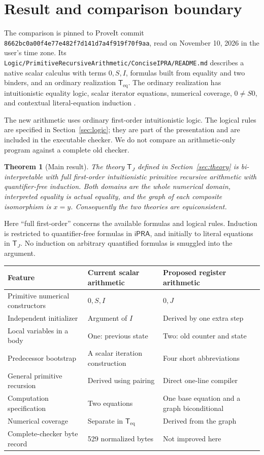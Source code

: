 \documentclass[11pt,letterpaper]{article}
\newtheorem{theorem}{Theorem}[section]
\theoremstyle{definition}\newtheorem{definition}[theorem]{Definition}
\theoremstyle{remark}\newtheorem{remark}[theorem]{Remark}
\newcommand{\ipra}{\mathsf{iPRA}}
\newcommand{\TJ}{\mathsf T_J}
\newcommand{\TI}{\mathsf T_{\mathrm{eq}}}
\newcommand{\file}[1]{{\small\nolinkurl{#1}}}
\begin{document}
\section{Result and comparison boundary}

The comparison is pinned to ProveIt commit
\texttt{8662bc0a00f4e77e482f7d141d7a4f919f70f9aa}, read on
November 10, 2026 in the user's time zone. Its
\file{Logic/PrimitiveRecursiveArithmetic/ConciseIPRA/README.md}
describes a native scalar calculus with terms $0,S,I$, formulas built
from equality and two binders, and an ordinary realization $\TI$.
The ordinary realization has intuitionistic equality logic, scalar
iterator equations, numerical coverage, $0\ne S0$, and contextual
literal-equation induction \cite{repo,basis}.

The new arithmetic uses ordinary first-order intuitionistic logic.
The logical rules are specified in Section~\ref{sec:logic}; they are
part of the presentation and are included in the executable checker.
We do not compare an arithmetic-only program against a complete old
checker.

\begin{theorem}[Main result]\label{thm:main}
The theory $\TJ$ defined in Section~\ref{sec:theory} is
bi-interpretable with full first-order intuitionistic primitive
recursive arithmetic with quantifier-free induction. Both domains are
the whole numerical domain, interpreted equality is actual equality,
and the graph of each composite isomorphism is $x=y$.
Consequently the two theories are equiconsistent.
\end{theorem}

Here ``full first-order'' concerns the available formulas and logical
rules. Induction is restricted to quantifier-free formulas in $\ipra$,
and initially to literal equations in $\TJ$. No induction on arbitrary
quantified formulas is smuggled into the argument.

\begin{center}\small
\begin{tabularx}{\linewidth}{@{}lXX@{}}
\toprule
Feature & Current scalar arithmetic & Proposed register arithmetic\\
\midrule
Primitive numerical constructors & $0,S,I$ & $0,J$\\
Independent initializer & Argument of $I$ & Derived by one extra step\\
Local variables in a body & One: previous state & Two: old counter and state\\
Predecessor bootstrap & A scalar iteration construction & Four short abbreviations\\
General primitive recursion & Derived using pairing & Direct one-line compiler\\
Computation specification & Two equations & One base equation and a graph biconditional\\
Numerical coverage & Separate in $\TI$ & Derived from the graph\\
Complete-checker byte record & 529 normalized bytes & Not improved here\\
\bottomrule
\end{tabularx}
\end{center}
\end{document}
